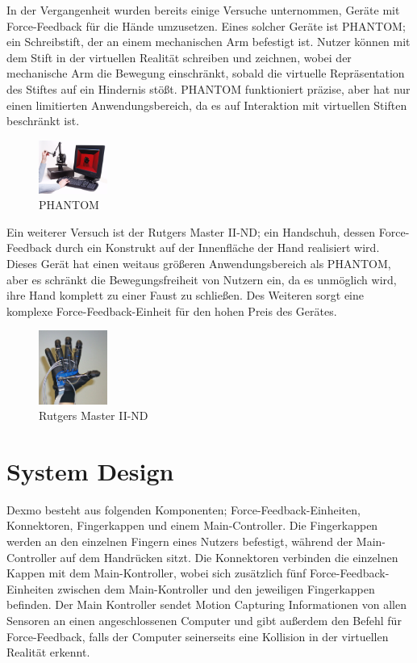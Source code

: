In der Vergangenheit wurden bereits einige Versuche unternommen, Geräte mit Force-Feedback für die Hände umzusetzen. Eines solcher Geräte ist PHANTOM; ein Schreibstift, der an einem mechanischen Arm befestigt ist. Nutzer können mit dem Stift in der virtuellen Realität schreiben und zeichnen, wobei der mechanische Arm die Bewegung einschränkt, sobald die virtuelle Repräsentation des Stiftes auf ein Hindernis stößt. PHANTOM funktioniert präzise, aber hat nur einen limitierten Anwendungsbereich, da es auf Interaktion mit virtuellen Stiften beschränkt ist.
\begin{figure}[!ht] %
\centering
\includegraphics[width=0.2\textwidth]{images/Phantom.jpg}
\caption{PHANTOM}
\end{figure}

Ein weiterer Versuch ist der Rutgers Master II-ND; ein Handschuh, dessen Force-Feedback durch ein Konstrukt auf der Innenfläche der Hand realisiert wird. Dieses Gerät hat einen weitaus größeren Anwendungsbereich als PHANTOM, aber es schränkt die Bewegungsfreiheit von Nutzern ein, da es unmöglich wird, ihre Hand komplett zu einer Faust zu schließen. Des Weiteren sorgt eine komplexe Force-Feedback-Einheit für den hohen Preis des Gerätes.

\begin{figure}[!ht] %
\centering
\includegraphics[width=0.2\textwidth]{images/Rutgers.jpg}
\caption{Rutgers Master II-ND}
\end{figure}


\chapter{System Design}\label{System Design}

Dexmo besteht aus folgenden Komponenten; Force-Feedback-Einheiten, Konnektoren, Fingerkappen und einem Main-Controller. Die Fingerkappen werden an den einzelnen Fingern eines Nutzers befestigt, während der Main-Controller auf dem Handrücken sitzt. Die Konnektoren verbinden die einzelnen Kappen mit dem Main-Kontroller, wobei sich zusätzlich fünf Force-Feedback-Einheiten zwischen dem Main-Kontroller und den jeweiligen Fingerkappen befinden. Der Main Kontroller sendet Motion Capturing Informationen von allen Sensoren an einen angeschlossenen Computer und gibt außerdem den Befehl für Force-Feedback, falls der Computer seinerseits eine Kollision in der virtuellen Realität erkennt.

